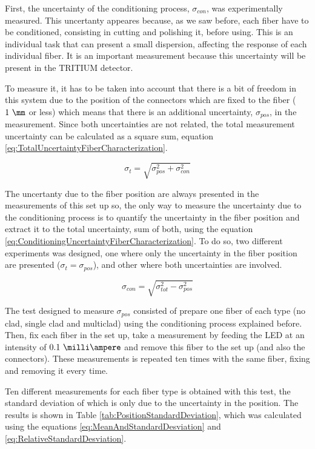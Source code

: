 First, the uncertainty of the conditioning process, $\sigma_{con}$, was experimentally measured. This uncertanty appeares because, as we saw before, each fiber have to be conditioned, consisting in cutting and polishing it, before using. This is an individual task that can present a small dispersion, affecting the response of each individual fiber. It is an important measurement because this uncertainty will be present in the TRITIUM detector.

To measure it, it has to be taken into account that there is a bit of freedom in this system due to the position of the connectors which are fixed to the fiber ($1~\mm$ or less) which means that there is an additional uncertainty, $\sigma_{pos}$, in the measurement. Since both uncertainties are not related, the total measurement uncertainty can be calculated as a square sum, equation \ref{eq:TotalUncertaintyFiberCharacterization}.

\begin{equation}
\sigma_{t} = \sqrt{\sigma^2_{pos} + \sigma^2_{con} }
\label{eq:TotalUncertaintyFiberCharacterization}
\end{equation}

The uncertanty due to the fiber position are always presented in the measurements of this set up so, the only way to measure the uncertainty due to the conditioning process is to quantify the uncertainty in the fiber position and extract it to the total uncertainty, sum of both, using the equation \ref{eq:ConditioningUncertaintyFiberCharacterization}. To do so, two different experiments was designed, one where only the uncertainty in the fiber position are presented ($\sigma_{t} = \sigma_{pos}$), and other where both uncertainties are involved.

\begin{equation}
\sigma_{con} = \sqrt{\sigma^2_{tot} - \sigma^2_{pos} }
\label{eq:ConditioningUncertaintyFiberCharacterization}
\end{equation}

The test designed to measure $\sigma_{pos}$ consisted of prepare one fiber of each type (no clad, single clad and multiclad) using the conditioning process explained before. Then, fix each fiber in the set up, take a measurement by feeding the LED at an intensity of $0.1~\milli\ampere$ and remove this fiber to the set up (and also the connectors). These measurements is repeated ten times with the same fiber, fixing and removing it every time.

Ten different measurements for each fiber type is obtained with this test, the standard deviation of which is only due to the uncertainty in the position. The results is shown in Table \ref{tab:PositionStandardDeviation}, which was calculated using the equations \ref{eq:MeanAndStandardDesviation} and \ref{eq:RelativeStandardDesviation}.

